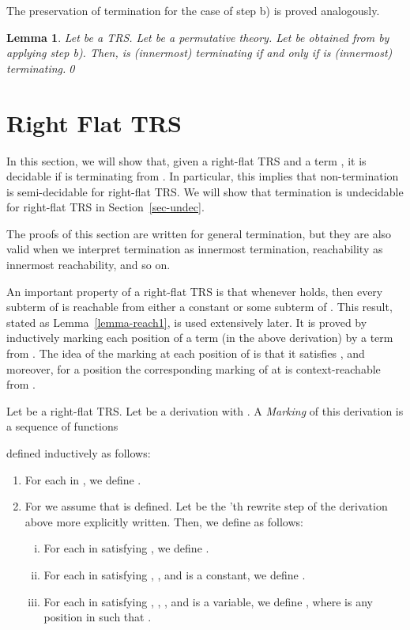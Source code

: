 \documentclass{LMCS}
\theoremstyle{plain}
\newtheorem{lemma}[thm]{Lemma}
\begin{document}
The preservation of termination for the case of step b)
is proved analogously.

\begin{lemma}\label{lemma-simplifying3}
Let  be a TRS. Let  be a permutative theory.
Let  be obtained from  by applying step b).
Then,  is (innermost) terminating if and only if 
is (innermost) terminating.\qed
\end{lemma}


\section{Right Flat TRS}\label{sec-right-flat}



\noindent In this section, we will show that, given a 
right-flat TRS  and a term ,
it is decidable if  is terminating from .
In particular, this implies that
non-termination is semi-decidable for
right-flat TRS.
We will show that termination is undecidable
for right-flat TRS in Section~\ref{sec-undec}.


The proofs of this section are
written for general termination, but they are also valid
when we interpret termination as innermost termination,
reachability as innermost reachability, and so on.

An important property of a right-flat TRS  is that
whenever  holds, then every subterm of  is
reachable from either a constant or some subterm of .
This result, stated as Lemma~\ref{lemma-reach1}, is 
used extensively later.  It is proved 
by inductively 
marking each position of a term (in the above derivation) by
a term from . The idea of
the marking  at each position  of  is that
it satisfies , and moreover,
for a position  the corresponding marking
 of  at  is context-reachable
from .

\begin{defi}
Let  be a right-flat TRS.
Let  be a derivation with .
A {\em Marking} of this derivation is a sequence
 of  functions

defined inductively as follows:
\begin{enumerate}[]
\item For each  in , we define .
\item For  we assume that  
is defined. Let  be the 'th
rewrite step of the derivation above more explicitly written. Then,
we define  as follows:
\begin{enumerate}[(i)]
\item For each  in 
satisfying , we define .
\item For each  in 
satisfying , , and  is a constant, 
we define .
\item For each  in  
satisfying , , , and  is a variable,
we define , where
 is any position in  such that .
\end{enumerate}
\end{enumerate}
\end{defi}
\end{document}
